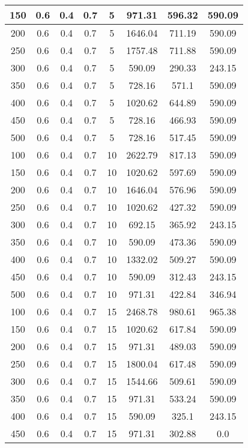 \documentclass[a4paper, 12pt]{extreport}
\begin{document}
\begin{itemize}
\begin{longtable}{|c|c|c|c|c|c|c|c|}
			150 & 0.6 & 0.4 & 0.7 & 5 & 971.31 & 596.32 & 590.09 \\\hline
			200 & 0.6 & 0.4 & 0.7 & 5 & 1646.04 & 711.19 & 590.09 \\\hline
			250 & 0.6 & 0.4 & 0.7 & 5 & 1757.48 & 711.88 & 590.09 \\\hline
			300 & 0.6 & 0.4 & 0.7 & 5 & 590.09 & 290.33 & 243.15 \\\hline
			350 & 0.6 & 0.4 & 0.7 & 5 & 728.16 & 571.1 & 590.09 \\\hline
			400 & 0.6 & 0.4 & 0.7 & 5 & 1020.62 & 644.89 & 590.09 \\\hline
			450 & 0.6 & 0.4 & 0.7 & 5 & 728.16 & 466.93 & 590.09 \\\hline
			500 & 0.6 & 0.4 & 0.7 & 5 & 728.16 & 517.45 & 590.09 \\\hline
			100 & 0.6 & 0.4 & 0.7 & 10 & 2622.79 & 817.13 & 590.09 \\\hline
			150 & 0.6 & 0.4 & 0.7 & 10 & 1020.62 & 597.69 & 590.09 \\\hline
			200 & 0.6 & 0.4 & 0.7 & 10 & 1646.04 & 576.96 & 590.09 \\\hline
			250 & 0.6 & 0.4 & 0.7 & 10 & 1020.62 & 427.32 & 590.09 \\\hline
			300 & 0.6 & 0.4 & 0.7 & 10 & 692.15 & 365.92 & 243.15 \\\hline
			350 & 0.6 & 0.4 & 0.7 & 10 & 590.09 & 473.36 & 590.09 \\\hline
			400 & 0.6 & 0.4 & 0.7 & 10 & 1332.02 & 509.27 & 590.09 \\\hline
			450 & 0.6 & 0.4 & 0.7 & 10 & 590.09 & 312.43 & 243.15 \\\hline
			500 & 0.6 & 0.4 & 0.7 & 10 & 971.31 & 422.84 & 346.94 \\\hline
			100 & 0.6 & 0.4 & 0.7 & 15 & 2468.78 & 980.61 & 965.38 \\\hline
			150 & 0.6 & 0.4 & 0.7 & 15 & 1020.62 & 617.84 & 590.09 \\\hline
			200 & 0.6 & 0.4 & 0.7 & 15 & 971.31 & 489.03 & 590.09 \\\hline
			250 & 0.6 & 0.4 & 0.7 & 15 & 1800.04 & 617.48 & 590.09 \\\hline
			300 & 0.6 & 0.4 & 0.7 & 15 & 1544.66 & 509.61 & 590.09 \\\hline
			350 & 0.6 & 0.4 & 0.7 & 15 & 971.31 & 533.24 & 590.09 \\\hline
			400 & 0.6 & 0.4 & 0.7 & 15 & 590.09 & 325.1 & 243.15 \\\hline
			450 & 0.6 & 0.4 & 0.7 & 15 & 971.31 & 302.88 & 0.0 \\\hline

\end{longtable}
\end{itemize}
\end{document}
